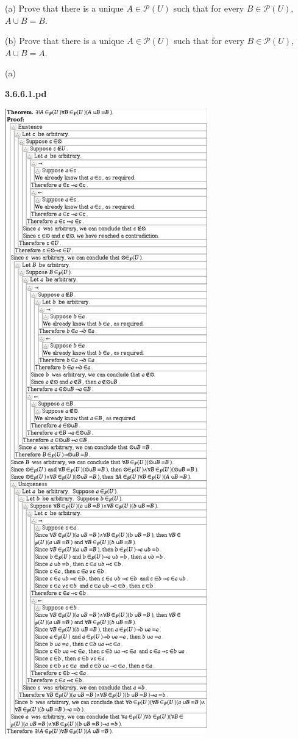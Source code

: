 \documentclass{article}
\begin{document}
\hspace{12pt}(a) Prove that there is a unique $A \in \mathcal{P} (U)$ such that for every $B \in \mathcal{P} (U)$, $A \cup B = B$.

\hspace{12pt}(b) Prove that there is a unique $A \in \mathcal{P} (U)$ such that for every $B \in \mathcal{P} (U)$, $A \cup B = A$.

\vspace{30pt}

(a)

\textbf{3.6.6.1.pd}
\vspace{10pt}

\includegraphics[scale=0.10]{3_6_6_1}
\end{document}
